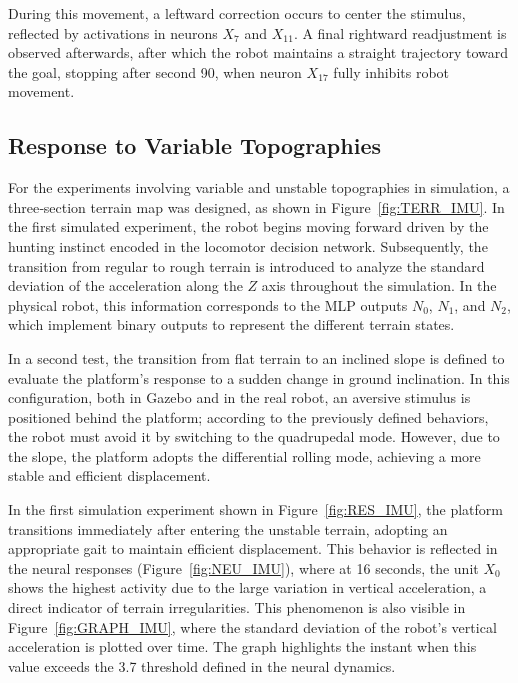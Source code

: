 \documentclass[preprint,12pt]{elsarticle}
\begin{document}
During this movement, a leftward correction occurs to center the stimulus, reflected by activations in neurons $X_7$ and $X_{11}$. A final rightward readjustment is observed afterwards, after which the robot maintains a straight trajectory toward the goal, stopping after second 90, when neuron $X_{17}$ fully inhibits robot movement. 

\subsection{Response to Variable Topographies}

For the experiments involving variable and unstable topographies in simulation, a three‐section terrain map was designed, as shown in Figure~\ref{fig:TERR_IMU}. In the first simulated experiment, the robot begins moving forward driven by the hunting instinct encoded in the locomotor decision network. Subsequently, the transition from regular to rough terrain is introduced to analyze the standard deviation of the acceleration along the $Z$ axis throughout the simulation. In the physical robot, this information corresponds to the MLP outputs $N_{0}$, $N_{1}$, and $N_{2}$, which implement binary outputs to represent the different terrain states. 

In a second test, the transition from flat terrain to an inclined slope is defined to evaluate the platform’s response to a sudden change in ground inclination. In this configuration, both in Gazebo and in the real robot, an aversive stimulus is positioned behind the platform; according to the previously defined behaviors, the robot must avoid it by switching to the quadrupedal mode. However, due to the slope, the platform adopts the differential rolling mode, achieving a more stable and efficient displacement. 

In the first simulation experiment shown in Figure~\ref{fig:RES_IMU}, the platform transitions immediately after entering the unstable terrain, adopting an appropriate gait to maintain efficient displacement. This behavior is reflected in the neural responses (Figure~\ref{fig:NEU_IMU}), where at 16 seconds, the unit $X_{0}$ shows the highest activity due to the large variation in vertical acceleration, a direct indicator of terrain irregularities. This phenomenon is also visible in Figure~\ref{fig:GRAPH_IMU}, where the standard deviation of the robot's vertical acceleration is plotted over time. The graph highlights the instant when this value exceeds the 3.7 threshold defined in the neural dynamics.
\end{document}
